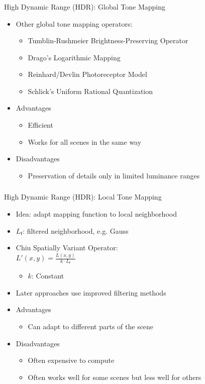 \documentclass[utf8,stillsansserifmath,fleqn,t]{beamer}
\begin{document}
\begin{frame}[label=tmo-1]
\frametitle{\insertsection}
High Dynamic Range (HDR): Global Tone Mapping
\begin{itemize}
\item Other global tone mapping operators:
    \begin{itemize}
    \item Tumblin-Rushmeier Brightness-Preserving Operator
    \item Drago's Logarithmic Mapping
    \item Reinhard/Devlin Photoreceptor Model
    \item Schlick's Uniform Rational Quantization
    \end{itemize}
\item Advantages
    \begin{itemize}
    \item Efficient
    \item Works for all scenes in the same way
    \end{itemize}
\item Disadvantages
    \begin{itemize}
    \item Preservation of details only in limited luminance ranges
    \end{itemize}
\end{itemize}
\end{frame}

\begin{frame}[label=tmo-2]
\frametitle{\insertsection}
High Dynamic Range (HDR): Local Tone Mapping\\[2ex]
\begin{itemize}
\item Idea: adapt mapping function to local neighborhood
\item $L_{\textsf{f}}$: filtered neighborhood, e.g. Gauss
\item Chiu Spatially Variant Operator:\\
    $\displaystyle L'(x,y) = \frac{L(x,y)}{k\cdot L_{\textsf{f}}}$
    \begin{itemize}
    \item $k$: Constant
    \end{itemize}
\item Later approaches use improved filtering methods
\item Advantages
    \begin{itemize}
    \item Can adapt to different parts of the scene
    \end{itemize}
\item Disadvantages
    \begin{itemize}
    \item Often expensive to compute
    \item Often works well for some scenes but less well for others
    \end{itemize}
\end{itemize}
\end{frame}
\end{document}

